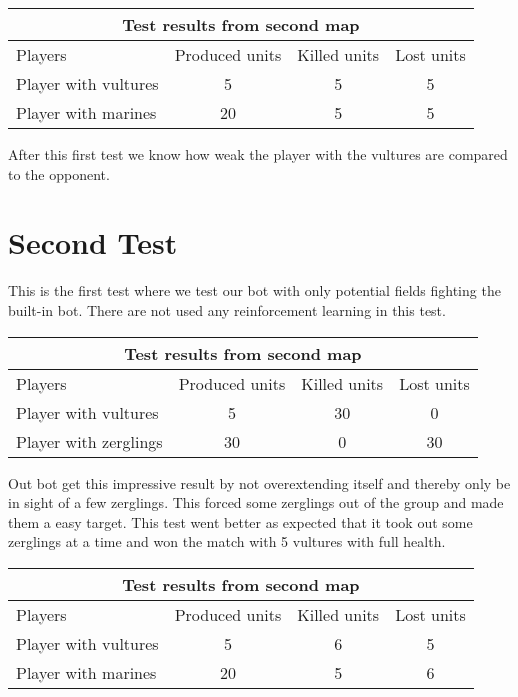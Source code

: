 \begin{centering}
 \begin{tabular}{|l|c|c|c|}
	\multicolumn{4}{c}{Test results from second map} \\
	\hline
	Players & Produced units & Killed units & Lost units\\
	\hline
		Player with vultures & 5 & 5 & 5\\
	\hline
		Player with marines & 20 & 5 & 5\\
	\hline

\end{tabular}
\end{centering}

After this first test we know how weak the player with the vultures are compared to the opponent.
\newpage
\section{Second Test} %
This is the first test where we test our bot with only potential fields fighting the built-in bot. There are not used any reinforcement learning in this test.\\

\begin{centering}
 \begin{tabular}{|l||c|c|c|}
	\multicolumn{4}{c}{Test results from second map} \\
	\hline
	Players & Produced units & Killed units & Lost units\\
	\hline
	\hline
		Player with vultures & 5 & 30 & 0\\
	\hline
		Player with zerglings & 30 & 0 & 30\\
	\hline

\end{tabular}
\end{centering}

Out bot get this impressive result by not overextending itself and thereby only be in sight of a few zerglings. This forced some zerglings out of the group and made them a easy target. This test went better as expected that it took out some zerglings at a time and won the match with 5 vultures with full health.\\

\begin{centering}
 \begin{tabular}{|l|c|c|c|}
	\multicolumn{4}{c}{Test results from second map} \\
	\hline
	Players & Produced units & Killed units & Lost units\\
	\hline
	\hline
		Player with vultures & 5 & 6 & 5\\
	\hline
		Player with marines & 20 & 5 & 6\\
	\hline

\end{tabular}
\end{centering}


